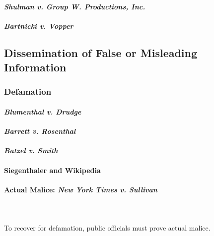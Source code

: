 
\paragraph{\emph{Shulman v. Group W. Productions, Inc.}}


\paragraph{\emph{Bartnicki v. Vopper}}


\subsection{Dissemination of False or Misleading Information}

\subsubsection{Defamation}


\paragraph{\emph{Blumenthal v. Drudge}}


\paragraph{\emph{Barrett v. Rosenthal}}


\paragraph{\emph{Batzel v. Smith}}


\paragraph{Siegenthaler and Wikipedia}


\newpage %
\paragraph{Actual Malice: \emph{New York Times v. Sullivan}}
~\\\\
To recover for defamation, public officials must prove actual malice.

